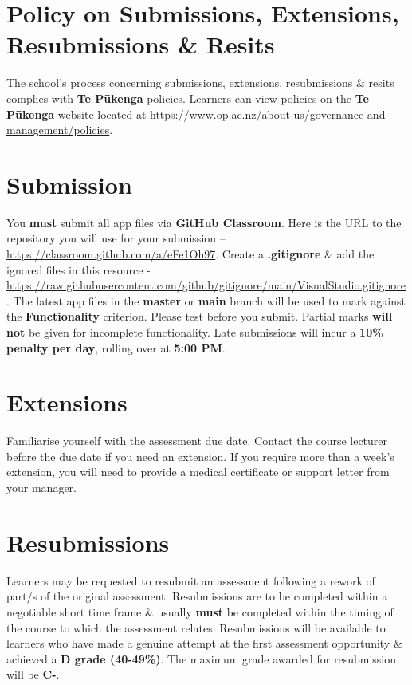 \documentclass{article}
\begin{document}
\section*{Policy on Submissions, Extensions, Resubmissions \& Resits}
The school's process concerning submissions, extensions, resubmissions \& resits complies with \textbf{Te Pūkenga} policies. Learners can view policies on the \textbf{Te Pūkenga} website located at \href{https://www.op.ac.nz/about-us/governance-and-management/policies}{https://www.op.ac.nz/about-us/governance-and-management/policies}.

\section*{Submission}
You \textbf{must} submit all app files via \textbf{GitHub Classroom}. Here is the URL to the repository you will use for your submission – \href{https://classroom.github.com/a/eFe1Oh97}{https://classroom.github.com/a/eFe1Oh97}.  Create a \textbf{.gitignore} \& add the ignored files in this resource - \href{https://raw.githubusercontent.com/github/gitignore/main/VisualStudio.gitignore}{https://raw.githubusercontent.com/github/gitignore/main/VisualStudio.gitignore}. The latest app files in the \textbf{master} or \textbf{main} branch will be used to mark against the \textbf{Functionality} criterion. Please test before you submit. Partial marks \textbf{will not} be given for incomplete functionality. Late submissions will incur a \textbf{10\% penalty per day}, rolling over at \textbf{5:00 PM}.

\section*{Extensions}
Familiarise yourself with the assessment due date. Contact the course lecturer before the due date if you need an extension. If you require more than a week's extension, you will need to provide a medical certificate or support letter from your manager.

\section*{Resubmissions}
Learners may be requested to resubmit an assessment following a rework of part/s of the original assessment. Resubmissions are to be completed within a negotiable short time frame \& usually \textbf{must} be completed within the timing of the course to which the assessment relates. Resubmissions will be available to learners who have made a genuine attempt at the first assessment opportunity \& achieved a \textbf{D grade (40-49\%)}. The maximum grade awarded for resubmission will be \textbf{C-}.
\end{document}
